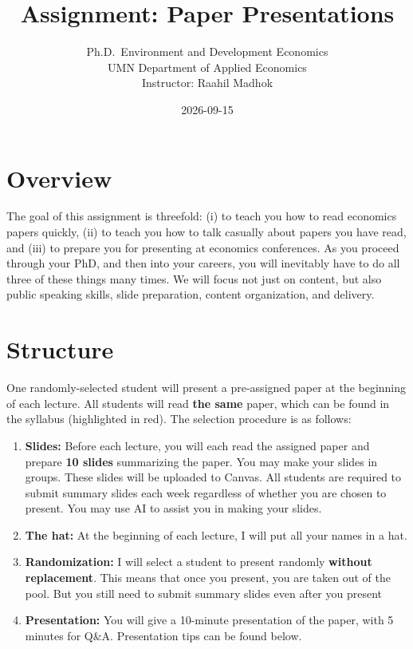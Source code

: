 \documentclass[
]{article}
\title{Assignment: Paper Presentations}
\subtitle{Ph.D.~Environment and Development Economics\\
UMN Department of Applied Economics\\
Instructor: Raahil Madhok}
\author{}
\date{\vspace{-2.5em}2026-09-15}
\begin{document}
\maketitle

\hypertarget{overview}{%
\section{Overview}\label{overview}}

The goal of this assignment is threefold: (i) to teach you how to read economics papers quickly, (ii) to teach you how to talk casually about papers you have read, and (iii) to prepare you for presenting at economics conferences. As you proceed through your PhD, and then into your careers, you will inevitably have to do all three of these things many times. We will focus not just on content, but also public speaking skills, slide preparation, content organization, and delivery.

\hypertarget{structure}{%
\section{Structure}\label{structure}}

One randomly-selected student will present a pre-assigned paper at the beginning of each lecture. All students will read \textbf{the same} paper, which can be found in the syllabus (highlighted in red). The selection procedure is as follows:

\begin{enumerate}
\def\labelenumi{\arabic{enumi}.}
\item
  \textbf{Slides:} Before each lecture, you will each read the assigned paper and prepare \textbf{10 slides} summarizing the paper. You may make your slides in groups. These slides will be uploaded to Canvas. All students are required to submit summary slides each week regardless of whether you are chosen to present. You may use AI to assist you in making your slides.
\item
  \textbf{The hat:} At the beginning of each lecture, I will put all your names in a hat.
\item
  \textbf{Randomization:} I will select a student to present randomly \textbf{without replacement}. This means that once you present, you are taken out of the pool. But you still need to submit summary slides even after you present
\item
  \textbf{Presentation:} You will give a 10-minute presentation of the paper, with 5 minutes for Q\&A. Presentation tips can be found below.
\end{enumerate}
\end{document}
